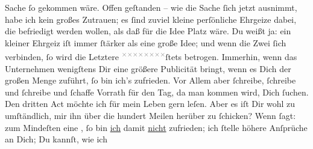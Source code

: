                Sache {\pb}ſo gekommen wäre. Offen geſtanden – wie die
               Sache ſich jetzt ausnimmt, habe ich kein großes Zutrauen; es ſind zuviel kleine
               perſönliche Ehrgeize dabei, die befriedigt werden wollen, als daß für die Idee Platz
               wäre. Du weißt ja: ein kleiner Ehrgeiz iſt immer ſtärker als eine große Idee; und
               wenn die Zwei ſich verbinden, ſo wird die Letztere \substVorne{}\textsuperscript{\textcolor{gray}{×}\-\textcolor{gray}{×}\-\textcolor{gray}{×}\-\textcolor{gray}{×}\-\textcolor{gray}{×}\-\textcolor{gray}{×}\-\textcolor{gray}{×}\-\textcolor{gray}{×}}\substDazwischen{}ſtets\substHinten{} betrogen. Immerhin, wenn das Unternehmen wenigſtens Dir eine größere Publicität bringt,
               wenn es Dich der großen Menge zuführt, ſo bin ich’s zufrieden. Vor Allem aber
               ſchreibe, ſchreibe und ſchreibe und ſchaffe Vorrath für den Tag, da man kommen wird,
               Dich ſuchen. Den dritten Act möchte ich für mein Leben gern leſen. Aber es iſt Dir
               wohl zu umſtändlich, mir ihn über die hundert Meilen herüber zu ſchicken? Wenn \textsc{\label{K_L02668-14v}\label{K_L02668-14}} ſagt: zum Mindeſten eine \label{K_L02668-15v}\label{K_L02668-15}, ſo bin \uline{ich} damit \uline{nicht} zufrieden; ich ſtelle höhere Anſprüche an Dich; Du kannſt, wie ich
